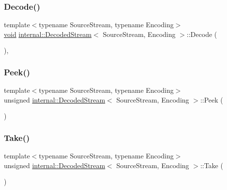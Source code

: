 \subsubsection{\texorpdfstring{Decode()}{Decode()}}
{\footnotesize\ttfamily template$<$typename Source\+Stream, typename Encoding$>$ \\
\hyperlink{imgui__impl__opengl3__loader_8h_ac668e7cffd9e2e9cfee428b9b2f34fa7}{void} \hyperlink{classinternal_1_1DecodedStream}{internal\+::\+Decoded\+Stream}$<$ Source\+Stream, Encoding $>$\+::Decode (\begin{DoxyParamCaption}{ }\end{DoxyParamCaption})\hspace{0.3cm}{\ttfamily [inline]}, {\ttfamily [private]}}

\mbox{\label{classinternal_1_1DecodedStream_ac78f2cbc03ae0d79a0fcfe6d56589d70}} 
\subsubsection{\texorpdfstring{Peek()}{Peek()}}
{\footnotesize\ttfamily template$<$typename Source\+Stream, typename Encoding$>$ \\
unsigned \hyperlink{classinternal_1_1DecodedStream}{internal\+::\+Decoded\+Stream}$<$ Source\+Stream, Encoding $>$\+::Peek (\begin{DoxyParamCaption}{ }\end{DoxyParamCaption})\hspace{0.3cm}{\ttfamily [inline]}}

\mbox{\label{classinternal_1_1DecodedStream_a62b45969ce169bef1da0600490329857}} 
\subsubsection{\texorpdfstring{Take()}{Take()}}
{\footnotesize\ttfamily template$<$typename Source\+Stream, typename Encoding$>$ \\
unsigned \hyperlink{classinternal_1_1DecodedStream}{internal\+::\+Decoded\+Stream}$<$ Source\+Stream, Encoding $>$\+::Take (\begin{DoxyParamCaption}{ }\end{DoxyParamCaption})\hspace{0.3cm}{\ttfamily [inline]}}



